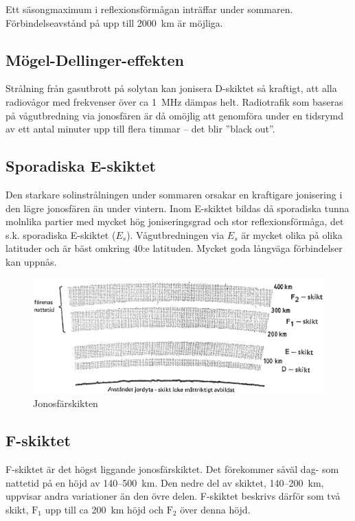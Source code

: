 Ett säsongmaximum i reflexionsförmågan inträffar under
sommaren. Förbindelseavstånd på upp till 2000~km är möjliga.

\subsection{Mögel-Dellinger-effekten}

Strålning från gasutbrott på solytan kan jonisera D-skiktet så
kraftigt, att alla radiovågor med frekvenser över ca 1~MHz dämpas
helt.  Radiotrafik som baseras på vågutbredning via jonosfären är då
omöjlig att genomföra under en tidsrymd av ett antal minuter upp till
flera timmar -- det blir ''black out''.

\subsection{Sporadiska E-skiktet}

Den starkare solinstrålningen under sommaren orsakar en kraftigare
jonisering i den lägre jonosfären än under vintern. Inom E-skiktet
bildas då sporadiska tunna molnlika partier med mycket hög
joniseringsgrad och stor reflexionsförmåga, det s.k. sporadiska
E-skiktet (\(E_s\)). Vågutbredningen via \(E_s\) är mycket olika på
olika latituder och är bäst omkring 40:e latituden. Mycket goda långväga
förbindelser kan uppnås.

\begin{figure}
  \includegraphics[width=\textwidth]{images/cropped_pdfs/bild_2_7-07.pdf}
  \caption{Jonosfärskikten}
  \label{fig:bildII7-7}
\end{figure}

\subsection{F-skiktet}

F-skiktet är det högst liggande jonosfärskiktet. Det förekommer såväl
dag- som nattetid på en höjd av 140--500~km. Den nedre del av skiktet,
140--200~km, uppvisar andra variationer än den övre delen. F-skiktet
beskrivs därför som två skikt, \(\mathrm{F_1}\) upp till ca 200~km
höjd och \(\mathrm{F_2}\) över denna höjd.

